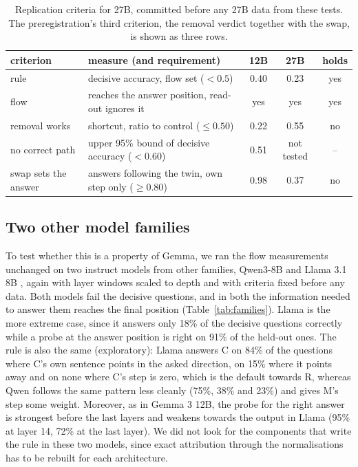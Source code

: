 \documentclass[10pt]{article}
\begin{document}
\begin{table}[t]
  \centering
  \small
  \caption{Replication criteria for 27B, committed before any 27B data from these tests. The preregistration's third
  criterion, the removal verdict together with the swap, is shown as three rows.}
  \label{tab:replication}
  \begin{tabular}{@{}llccc@{}}
    \toprule
    criterion & measure (and requirement) & 12B & 27B & holds \\
    \midrule
    rule & decisive accuracy, flow set ($<0.5$) & 0.40 & 0.23 & yes \\
    flow & reaches the answer position, read-out ignores it & yes & yes & yes \\
    removal works & shortcut, ratio to control ($\le 0.50$) & 0.22 & 0.55 & no \\
    no correct path & upper 95\% bound of decisive accuracy ($<0.60$) & 0.51 & not tested & -- \\
    swap sets the answer & answers following the twin, own step only ($\ge 0.80$) & 0.98 & 0.37 & no \\
    \bottomrule
  \end{tabular}
\end{table}

\subsection{Two other model families}\label{sec:families}
To test whether this is a property of Gemma, we ran the flow measurements unchanged on two instruct models from other
families, Qwen3-8B \citep{yang2025qwen3} and Llama 3.1 8B \citep{grattafiori2024llama3}, again with layer windows
scaled to depth and with criteria fixed before any data. Both models fail the decisive questions, and in both the
information needed to answer them reaches the final position (Table~\ref{tab:families}). Llama is the more extreme
case, since it answers only 18\% of the decisive questions correctly while a probe at the answer position is right on
91\% of the held-out ones. The rule is also the same (exploratory): Llama answers C on 84\% of the questions where C's
own sentence points in the asked direction, on 15\% where it points away and on none where C's step is zero, which is
the default towards R, whereas Qwen follows the same pattern less cleanly (75\%, 38\% and 23\%) and gives M's step some
weight. Moreover, as in Gemma 3 12B, the probe for the right answer is strongest before the last layers and weakens
towards the output in Llama (95\% at layer 14, 72\% at the last layer). We did not look for the components that write
the rule in these two models, since exact attribution through the normalisations has to be rebuilt for each
architecture.
\end{document}
